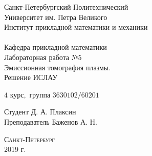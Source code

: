 \documentclass[a4]{article}
\begin{document}
\def\contentsname{\LARGE{Содержание}}
\thispagestyle{empty}
\begin{center} 
\vspace{2cm} 
{\Large \sc Санкт-Петербургский Политехнический}\\
\vspace{2mm}
{\Large \sc Университет} им. {\Large\sc Петра Великого}\\
\vspace{1cm}
{\large \sc Институт прикладной математики и механики\\ 
\vspace{0.5mm}
\textsc{}}\\ 
\vspace{0.5mm}
{\large\sc Кафедра прикладной математики}\\
\vspace{15mm}
{\huge \sc Лабораторная работа №$5$\\
\vspace{4mm}
Эмиссионная томография плазмы.\\
\vspace{4mm}
Решение ИСЛАУ
\vspace{6mm}
 }
\vspace*{2mm}
\vspace{1cm}

{\sc $4$ курс$,$ группа $3630102/60201$}

\vspace{2cm} 
Студент \hfill Д. А. Плаксин\\
\vspace{1cm}
Преподаватель \hfill Баженов А. Н.\\
\vspace{20mm} 

\end{center} 
\begin{center}
\vfill {\large\textsc{Санкт-Петербург}}\\ 
2019 г.
\end{center}

\end{document}
